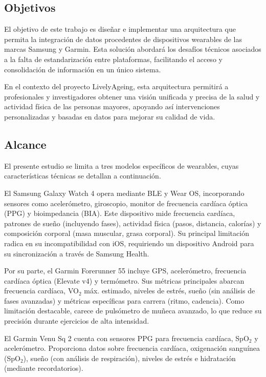 \subsection{Objetivos}
El objetivo de este trabajo es diseñar e implementar una arquitectura que permita la integración de datos procedentes de dispositivos wearables de las marcas Samsung y Garmin. Esta solución abordará los desafíos técnicos asociados a la falta de estandarización entre plataformas, facilitando el acceso y consolidación de información en un único sistema.

En el contexto del proyecto LivelyAgeing, esta arquitectura permitirá a profesionales y investigadores obtener una visión unificada y precisa de la salud y actividad física de las personas mayores, apoyando así intervenciones personalizadas y basadas en datos para mejorar su calidad de vida.



\subsection{Alcance} %

El presente estudio se limita a tres modelos específicos de wearables, cuyas características técnicas se detallan a continuación. 

El Samsung Galaxy Watch 4 opera mediante BLE y Wear OS, incorporando sensores como acelerómetro, giroscopio, monitor de frecuencia cardíaca óptica (PPG) y bioimpedancia (BIA). Este dispositivo mide frecuencia cardíaca, patrones de sueño (incluyendo fases), actividad física (pasos, distancia, calorías) y composición corporal (masa muscular, grasa corporal). Su principal limitación radica en su incompatibilidad con iOS, requiriendo un dispositivo Android para su sincronización a través  de Samsung Health. \cite{SamsungW4Specifications}


Por su parte, el Garmin Forerunner 55 incluye GPS, acelerómetro, frecuencia cardíaca óptica (Elevate v4) y termómetro. Sus métricas principales abarcan frecuencia cardíaca, VO$_2$ máx. estimado, niveles de estrés, sueño (sin análisis de fases avanzadas) y métricas específicas para carrera (ritmo, cadencia). Como limitación destacable, carece de pulsómetro de muñeca avanzado, lo que reduce su precisión durante ejercicios de alta intensidad. \cite{GarminForerunner55}


El Garmin Venu Sq 2 cuenta con sensores PPG para frecuencia cardíaca, SpO$_2$ y acelerómetro. Proporciona datos sobre frecuencia cardíaca, oxigenación sanguínea (SpO$_2$), sueño (con análisis de respiración), niveles de estrés e hidratación (mediante recordatorios). \cite{GarminVenuSq2}

